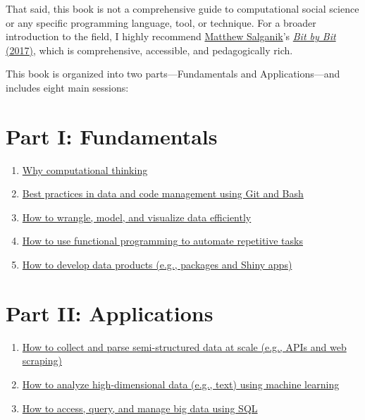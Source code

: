 \documentclass[
]{book}
\providecommand{\tightlist}{%
  \setlength{\itemsep}{0pt}\setlength{\parskip}{0pt}}
\begin{document}
That said, this book is not a comprehensive guide to computational social science or any specific programming language, tool, or technique. For a broader introduction to the field, I highly recommend \href{http://www.princeton.edu/~mjs3/}{Matthew Salganik}'s \href{https://www.bitbybitbook.com/}{\emph{Bit by Bit} (2017)}, which is comprehensive, accessible, and pedagogically rich.

This book is organized into two parts---Fundamentals and Applications---and includes eight main sessions:

\section{Part I: Fundamentals}\label{part-i-fundamentals}

\begin{enumerate}
\def\labelenumi{\arabic{enumi}.}
\tightlist
\item
  \hyperref[motivation]{Why computational thinking}\\
\item
  \hyperref[git_bash]{Best practices in data and code management using Git and Bash}\\
\item
  \hyperref[tidy_data]{How to wrangle, model, and visualize data efficiently}\\
\item
  \hyperref[functional_programming]{How to use functional programming to automate repetitive tasks}\\
\item
  \hyperref[products]{How to develop data products (e.g., packages and Shiny apps)}
\end{enumerate}

\section{Part II: Applications}\label{part-ii-applications}

\begin{enumerate}
\def\labelenumi{\arabic{enumi}.}
\setcounter{enumi}{5}
\tightlist
\item
  \hyperref[semi_structured_data]{How to collect and parse semi-structured data at scale (e.g., APIs and web scraping)}\\
\item
  \hyperref[machine_learning]{How to analyze high-dimensional data (e.g., text) using machine learning}\\
\item
  \hyperref[big_data]{How to access, query, and manage big data using SQL}
\end{enumerate}
\end{document}
